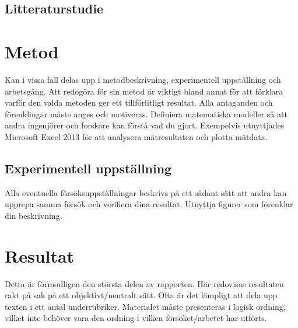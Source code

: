\documentclass[a4paper]{article}
\begin{document}
\subsection{Litteraturstudie}


\section{Metod}

Kan i vissa fall delas upp i metodbeskrivning, experimentell uppställning och arbetsgång. Att redogöra för sin metod är viktigt bland annat för att förklara varför den valda metoden ger ett tillförlitligt resultat. Alla antaganden och förenklingar måste anges och motiveras. Definiera matematiska modeller så att andra ingenjörer och forskare kan förstå vad du gjort.
Exempelvis utnyttjades Microsoft Excel 2013 för att analysera mätresultaten och plotta mätdata.


\subsection{Experimentell uppställning}

Alla eventuella försöksuppställningar beskrivs på ett sådant sätt att andra kan upprepa samma försök och verifiera dina resultat. Utnyttja figurer som förenklar din beskrivning.

\section{Resultat}


Detta är förmodligen den största delen av rapporten. Här redovisas resultaten rakt på sak på ett objektivt/neutralt sätt. Ofta är det lämpligt att dela upp texten i ett antal underrubriker. Materialet måste presenteras i logisk ordning, vilket inte behöver vara den ordning i vilken försöket/arbetet har utförts.
\end{document}
